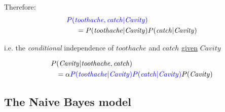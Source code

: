 \begin{frame}


Therefore:\slidesonly{\\ \vspace{-7mm}}
\begin{align}
{
\color{blue}
P(\mathit{toothache}
, \mathit{catch}
 | \mathit{Cavity}) 
} &\\
= P(\mathit{toothache}
| \mathit{Cavity}) &P(\mathit{catch}
| \mathit{Cavity})
\label{eq:condindep}
\end{align}

i.e. the \emph{conditional} independence of $\mathit{toothache}$ and $\mathit{catch}$ \underline{given} $\mathit{Cavity}$

\pause


\svspace{-4mm}

\begin{align}
P(\mathit{Cavity}|\mathit{toothache}, \mathit{catch}) &\\
= \alpha {\color{blue}P(\mathit{toothache}| \mathit{Cavity})} &
{\color{blue}P(\mathit{catch}| \mathit{Cavity})} P(\mathit{Cavity})
\end{align}

\end{frame}

\subsection{The Naive Bayes model}

